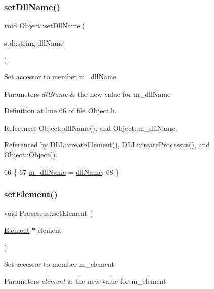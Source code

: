 \subsubsection{\texorpdfstring{set\+Dll\+Name()}{setDllName()}}
{\footnotesize\ttfamily void Object\+::set\+Dll\+Name (\begin{DoxyParamCaption}\item[{std\+::string}]{dll\+Name }\end{DoxyParamCaption})\hspace{0.3cm}{\ttfamily [inline]}, {\ttfamily [inherited]}}

Set accessor to member m\+\_\+dll\+Name 
\begin{DoxyParams}{Parameters}
{\em dll\+Name} & the new value for m\+\_\+dll\+Name \\
\hline
\end{DoxyParams}


Definition at line 66 of file Object.\+h.



References Object\+::dll\+Name(), and Object\+::m\+\_\+dll\+Name.



Referenced by D\+L\+L\+::create\+Element(), D\+L\+L\+::create\+Processus(), and Object\+::\+Object().


\begin{DoxyCode}
66                                       \{
67     \hyperlink{classObject_a01afbeacebb8db6831559972ec362eb3}{m\_dllName} = \hyperlink{classObject_a2e3947f2870094c332d7454117f3ec63}{dllName};
68   \}
\end{DoxyCode}
\mbox{\label{classProcessus_a8ddef94227d83d9dae2cd49aebc33353}} 
\subsubsection{\texorpdfstring{set\+Element()}{setElement()}}
{\footnotesize\ttfamily void Processus\+::set\+Element (\begin{DoxyParamCaption}\item[{\hyperlink{classElement}{Element} $\ast$}]{element }\end{DoxyParamCaption})\hspace{0.3cm}{\ttfamily [inline]}}

Set accessor to member m\+\_\+element 
\begin{DoxyParams}{Parameters}
{\em element} & the new value for m\+\_\+element \\
\hline
\end{DoxyParams}


